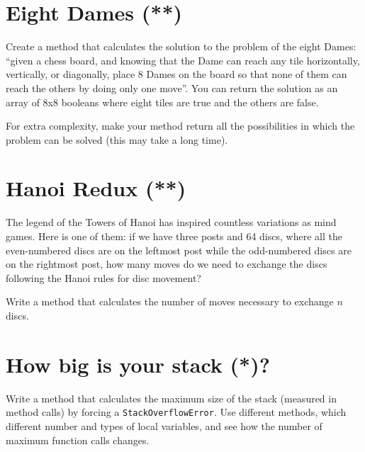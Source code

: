 \documentclass{article}
\begin{document}


\section{Eight Dames (**)}
\label{sec:eight-dames}

Create a method that calculates the solution to the problem of the
eight Dames: ``given a chess board, and knowing that the Dame can reach
any tile horizontally, vertically, or diagonally, place 8 Dames on the
board so that none of them can reach the others by doing only one
move''. You can return the solution as an array of 8x8 booleans where
eight tiles are true and the others are false. 

For extra complexity, make your method return all the possibilities in
which the problem can be solved (this may take a long time). 

\section{Hanoi Redux (**)}
\label{sec:hanoi-redux}

The legend of the Towers of Hanoi has inspired countless variations as
mind games. Here is one of them: if we have three posts and 64 discs,
where all the even-numbered discs are on the leftmost post while the
odd-numbered discs are on the rightmost post, how many moves do we
need to exchange the discs following the Hanoi rules for disc
movement? 

Write a method that calculates the number of moves necessary to
exchange $n$ discs. 

\section{How big is your stack (*)?}
\label{sec:how-big-your}

Write a method that calculates the maximum size of the stack (measured
in method calls) by forcing a \verb+StackOverflowError+. Use different
methods, which different number and types of local variables, and see
how the number of maximum function calls changes.

\end{document}
